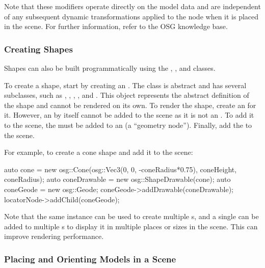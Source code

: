 Note that these modifiers operate directly on the model data and are independent
of any subsequent dynamic transformations applied to the node when it is placed
in the scene. For further information, refer to the OSG knowledge base.

\subsubsection{Creating Shapes}
\label{sec:graphics:osg-creating-shapes}

Shapes can also be built programmatically using the ,
, and  classes.

To create a shape, start by creating an . The
 class is abstract and has several subclasses, such as
, , ,
, and . This object represents the
abstract definition of the shape and cannot be rendered on its own. To render
the shape, create an  for it. However, an
 by itself cannot be added to the scene as it is not
an . To add it to the scene, the 
must be added to an  (a ``geometry node''). Finally, add the
 to the scene.

For example, to create a cone shape and add it to the scene:

\begin{cpp}
auto cone = new osg::Cone(osg::Vec3(0, 0, -coneRadius*0.75),
                          coneHeight, coneRadius);
auto coneDrawable = new osg::ShapeDrawable(cone);
auto coneGeode = new osg::Geode;
coneGeode->addDrawable(coneDrawable);
locatorNode->addChild(coneGeode);
\end{cpp}

Note that the same  instance can be used to create multiple
s, and a single  can be
added to multiple s to display it in multiple places or sizes
in the scene. This can improve rendering performance.

\subsubsection{Placing and Orienting Models in a Scene}
\label{sec:graphics:osg-placing-and-orienting-models}

